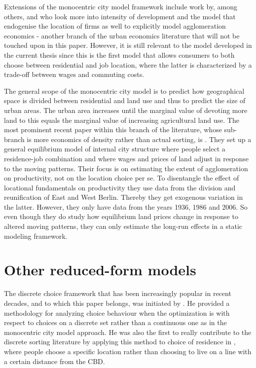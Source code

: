 Extensions of the monocentric city model framework include work by, among others, \citet{McMillen2006a} and \citet{AhlfeldtMcMillen2015} who look more into intensity of development and the \citet{OgawaFujita1980} model that endogenise the location of firms as well to explicitly model agglomeration economics - another branch of the urban economics literature that will not be touched upon in this paper. However, it is still relevant to the model developed in the current thesis since this is the first model that allows consumers to both choose between residential and job location, where the latter is characterized by a trade-off between wages and commuting costs. 

The general scope of the monocentric city model is to predict how geographical space is divided between residential and land use and thus to predict the size of urban areas. The urban area increases until the marginal value of devoting more land to this equals the marginal value of increasing agricultural land use. The most prominent recent paper within this branch of the literature, whose sub-branch is more economics of density rather than actual sorting,  is \citet{Ahlfeldtetal2015}. They set up a general equilibrium model of internal city structure where people select a residence-job combination and where wages and prices of land adjust in response to the moving patterns. Their focus is on estimating the extent of agglomeration on productivity, not on the location choice per se. To disentangle the effect of locational fundamentals on productivity they use data from the division and reunification of East and West Berlin. Thereby they get exogenous variation in the latter. However, they only have data from the years 1936, 1986 and 2006. So even though they do study how equilibrium land prices change in response to altered moving patterns, they can only estimate the long-run effects in a static modeling framework. 

\section{Other reduced-form models}
The discrete choice framework that has been increasingly popular in recent decades, and to which this paper belongs, was initiated by \citet{McFadden1974}. He provided a methodology for analyzing choice behaviour when the optimization is with respect to choices on a discrete set rather than a continuous one as in the monocentric city model approach. He was also the first to really contribute to the discrete sorting literature by applying this method to choice of residence in \citet{McFadden1978}, where people choose a specific location rather than choosing to live on a line with a certain distance from the CBD. 

